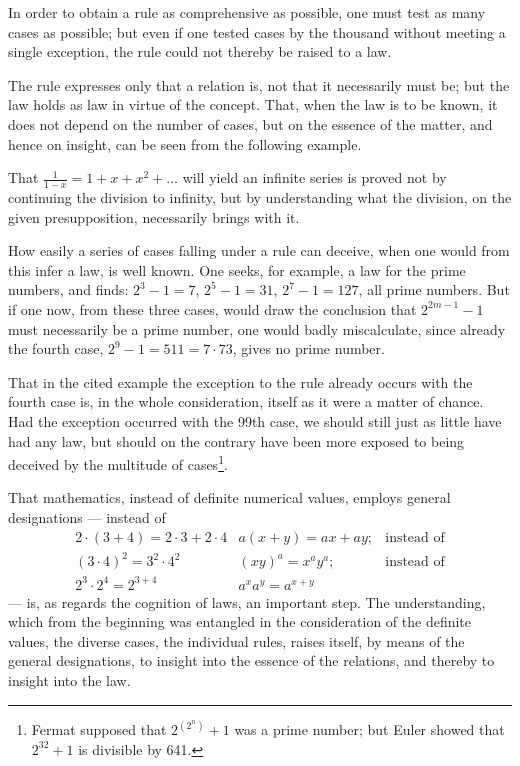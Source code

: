 \documentclass[12pt]{book}
\begin{document}
In order to obtain a rule as comprehensive as possible, one must test as many
cases as possible; but even if one tested cases by the thousand without meeting
a single exception, the rule could not thereby be raised to a law.

The rule expresses only that a relation is, not that it necessarily must
be; but the law holds as law in virtue of the concept. That, when the law is to
be known, it does not depend on the number of cases, but on the essence of
the matter, and hence on insight, can be seen from the following example.

That $\frac{1}{1-x} = 1 + x + x^{2} + \ldots$ will yield an infinite series is
proved not by continuing the division to infinity,
but by understanding what the division, on the given presupposition,
necessarily brings with it.

How easily a series of cases falling under a rule can deceive, when one would
from this infer a law, is well known. One seeks, for example, a law for the
prime numbers, and finds: $2^{3}-1 = 7$, $2^{5}-1 = 31$, $2^{7}-1 = 127$, all
prime numbers. But if one now, from these three cases, would draw the conclusion
that $2^{2m-1}-1$ must necessarily be a prime number, one would badly
miscalculate, since already the fourth case, $2^{9}-1 = 511 = 7\cdot 73$, gives
no prime number.

That in the cited example the exception to the rule already occurs with the
fourth case is, in the whole consideration, itself as it were a matter of
chance. Had the exception occurred with the 99th case, we should still just as
little have had any law, but should on the contrary have been more exposed to
being deceived by the multitude of cases\footnote{Fermat supposed that
$2^{(2^{n})}+1$ was a prime number; but Euler showed that $2^{32}+1$ is
divisible by 641.}.

That mathematics, instead of definite numerical values, employs general
designations --- instead of
\[
\begin{array}{lll}
2\cdot(3+4) = 2\cdot 3 + 2\cdot 4 & a(x+y) = ax + ay; & \text{instead of}\\[2pt]
(3\cdot 4)^{2} = 3^{2}\cdot 4^{2} & (xy)^{a} = x^{a}y^{a}; & \text{instead of}\\[2pt]
2^{3}\cdot 2^{4} = 2^{3+4} & a^{x}a^{y} = a^{x+y} &
\end{array}
\]
--- is, as regards the cognition of laws, an important step. The understanding,
which from the beginning was entangled in the consideration of the definite
values, the diverse cases, the individual rules, raises itself, by means of the
general designations, to insight into the essence of the relations, and thereby
to insight into the law.
\end{document}
